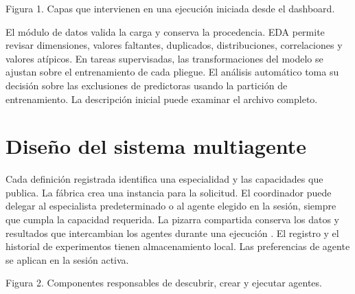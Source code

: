 \documentclass[11pt,a4paper]{article}
\begin{document}
\begin{center}

\small Figura 1. Capas que intervienen en una ejecución iniciada desde el dashboard.
\end{center}

El módulo de datos valida la carga y conserva la procedencia. EDA permite revisar dimensiones, valores faltantes, duplicados, distribuciones, correlaciones y valores atípicos. En tareas supervisadas, las transformaciones del modelo se ajustan sobre el entrenamiento de cada pliegue. El análisis automático toma su decisión sobre las exclusiones de predictoras usando la partición de entrenamiento. La descripción inicial puede examinar el archivo completo.

\section{Diseño del sistema multiagente}

Cada definición registrada identifica una especialidad y las capacidades que publica. La fábrica crea una instancia para la solicitud. El coordinador puede delegar al especialista predeterminado o al agente elegido en la sesión, siempre que cumpla la capacidad requerida. La pizarra compartida conserva los datos y resultados que intercambian los agentes durante una ejecución \cite{corkill}. El registro y el historial de experimentos tienen almacenamiento local. Las preferencias de agente se aplican en la sesión activa.

\begin{center}

\small Figura 2. Componentes responsables de descubrir, crear y ejecutar agentes.
\end{center}
\clearpage
\end{document}
